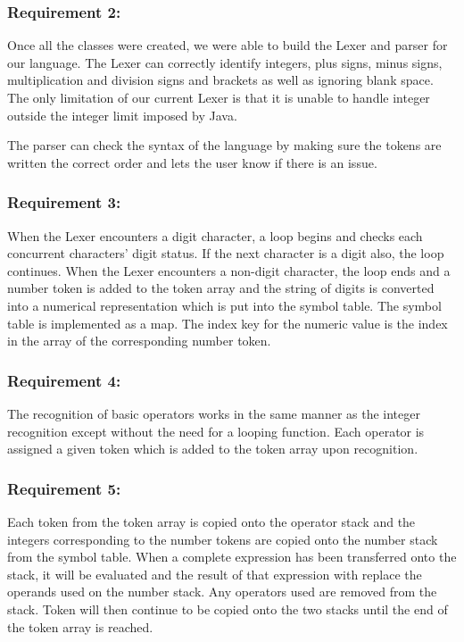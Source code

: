 \documentclass[a4paper, oneside, 11pt]{report}
\begin{document}
\subsubsection{Requirement 2:}

Once all the classes were created, we were able to build the Lexer and parser for our language. The Lexer can correctly identify integers, plus signs, minus signs, multiplication and division signs and brackets as well as ignoring blank space. The only limitation of our current Lexer is that it is unable to handle integer outside the integer limit imposed by Java. 

The parser can check the syntax of the language by making sure the tokens are written the correct order and lets the user know if there is an issue. 

\subsubsection{Requirement 3:}

When the Lexer encounters a digit character, a loop begins and checks each concurrent characters’ digit status. If the next character is a digit also, the loop continues. When the Lexer encounters a non-digit character, the loop ends and a number token is added to the token array and the string of digits is converted into a numerical representation which is put into the symbol table. The symbol table is implemented as a map. The index key for the numeric value is the index in the array of the corresponding number token. 

\subsubsection{Requirement 4:}

The recognition of basic operators works in the same manner as the integer recognition except without the need for a looping function. Each operator is assigned a given token which is added to the token array upon recognition. 

\subsubsection{Requirement 5:}

Each token from the token array is copied onto the operator stack and the integers corresponding to the number tokens are copied onto the number stack from the symbol table. When a complete expression has been transferred onto the stack, it will be evaluated and the result of that expression with replace the operands used on the number stack. Any operators used are removed from the stack. Token will then continue to be copied onto the two stacks until the end of the token array is reached.  
\end{document}
